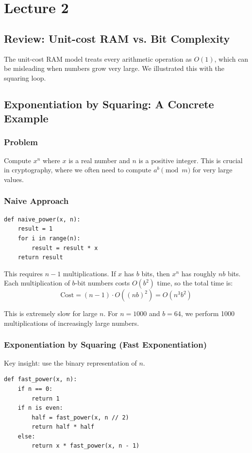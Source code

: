 \documentclass[11pt]{article}
\begin{document}
\section{Lecture 2}

\subsection*{Review: Unit-cost RAM vs. Bit Complexity}
The unit-cost RAM model treats every arithmetic operation as $O(1)$, which can be misleading when numbers grow very large. We illustrated this with the squaring loop.

\subsection*{Exponentiation by Squaring: A Concrete Example}

\subsubsection*{Problem}
Compute $x^n$ where $x$ is a real number and $n$ is a positive integer. This is crucial in cryptography, where we often need to compute $a^b \pmod{m}$ for very large values.

\subsubsection*{Naive Approach}
\begin{lstlisting}
def naive_power(x, n):
    result = 1
    for i in range(n):
        result = result * x
    return result
\end{lstlisting}

This requires $n-1$ multiplications. If $x$ has $b$ bits, then $x^n$ has roughly $nb$ bits. Each multiplication of $b$-bit numbers costs $O(b^2)$ time, so the total time is:
\[
\text{Cost} = (n-1) \cdot O((nb)^2) = O(n^3 b^2)
\]

This is extremely slow for large $n$. For $n = 1000$ and $b = 64$, we perform 1000 multiplications of increasingly large numbers.

\subsubsection*{Exponentiation by Squaring (Fast Exponentiation)}
Key insight: use the binary representation of $n$.

\begin{lstlisting}
def fast_power(x, n):
    if n == 0:
        return 1
    if n is even:
        half = fast_power(x, n // 2)
        return half * half
    else:
        return x * fast_power(x, n - 1)
\end{lstlisting}
\end{document}
